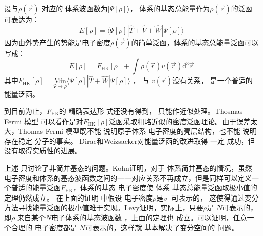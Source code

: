 {设}与$\rho(\vec{r})$%
对应的%
体系波函数为$|\Psi[\rho]\rangle$，%
体系的基态总能量作为$\rho(\vec{r})
$的泛函%
{可表达}为：
$$E[\rho]=\langle\Psi[\rho]|\hat{T}+\hat{V}+\hat{W}|\Psi[\rho]\rangle$$
{因为由外势产生的势能是电子密度$\rho(\vec r)$的简单泛函，}体系的{基态}总能量泛函可以写成：
$$E[\rho]=F_{\mathrm{HK}}[\rho]+\int\rho(\vec{r})v(\vec{r})\textrm{d}^3\vec{r}$$
其中$F_{\mathrm{HK}}[\rho]=\underset{\Psi\to\rho}{\mathrm{Min}}\langle\Psi[\rho]|\hat{T}+\hat{W}|\Psi[\rho]\rangle$%
{，}%
与%
{$v(\vec r)$}没有关系，%
{是一个普适的能量泛函。}

到目前为止，$F_{\mathrm{HK}}$的%
{精确表达形}
式还没有得到，%
{只能作近似处理}。Thosmas-Fermi%
{模型}%
{可以看作是对$F_{\mathrm{HK}}[\rho]$泛函采取粗略近似的密度泛函理论。由于误差太}大，Thomas-Fermi%
{模型}既不能%
{说明}原子体系%
电子密度的壳层结构，也不能%
{说明存在}稳定%
分子{的事实}。%
Dirac\cite{PCPS26-376_1930}和Weizsacker\cite{ZP96-431_1935}对能量泛函的改进取得%
一定%
{成功}，但%
{没有取得实质性的进展}。

上述%
只讨论了非简并基态的问题{。}Kohn证明\cite{Bassani-Fumi-Tosi}，对于%
{体系简并基态}的情况，虽然%
{电}子密度和体系的基态波函数之间的一一对应关系不再成立，但是同样可以定义一个普适的能量泛函$F_{\mathrm{HK}}$，体系的基态%
{电}子密度使%
体系%
基态{总}能量{泛函}取极小{值的定理}仍然成立。%
{在上}面的证明%
{中}假设%
{电}子密度$\rho$是\textit{v}\,-\,可表示的，%
{这使得通过变分方法寻找能量泛函的极小值难于实现}。Levy\cite{PNAS76-6062_1979}证明，实际上，只要$\rho$是
{$N$}可表示的，即$\rho$%
{来自}某个$N$电子体系的基态波函数%
，上面的定理也%
成立。可以证明\cite{PRB12-2111_1975,IJQC24-243_1983}，任意一个合理的%
{电}子密度都是%
{$N$}可表示的，这样就%
基本解决{了}变分空间的%
问题。

